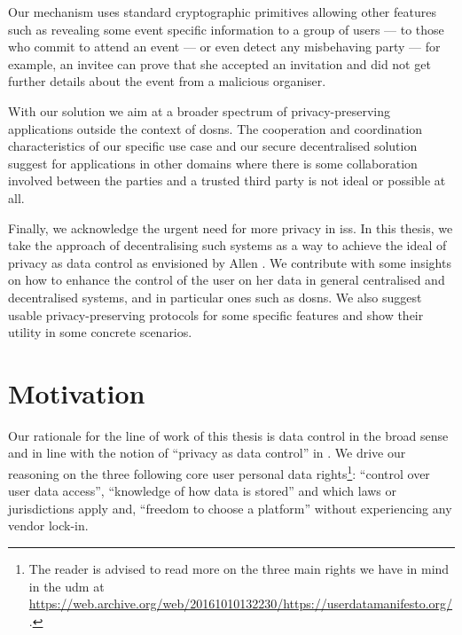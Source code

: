 Our mechanism uses standard cryptographic primitives allowing other features such 
as revealing some event specific information to a group of users --- to those who 
commit to attend an event --- or even detect any misbehaving party --- for example, 
an invitee can prove that she accepted an invitation and did not get further details 
about the event from a malicious organiser.

With our solution we aim at a broader spectrum of privacy-preserving applications 
outside the context of \acp{dosn}. The cooperation and coordination characteristics 
of our specific use case and our secure decentralised solution suggest for applications 
in other domains where there is some collaboration involved between the parties 
and a trusted third party is not ideal or possible at all.

Finally, we acknowledge the urgent need for more privacy in \acp{is}. 
In this thesis, we take the approach of decentralising such systems as a way to 
achieve the ideal of privacy as data control as envisioned by Allen \cite{Allen99}. 
We contribute with some insights on how to enhance the control of the user on her 
data in general centralised and decentralised systems, and in particular ones such 
as \acp{dosn}. We also suggest usable privacy-preserving protocols for some specific 
features and show their utility in some concrete scenarios.

\section{Motivation}
    \label{section:thesis:motivation}
Our rationale for the line of work of this thesis is data control in the broad sense 
and in line with the notion of ``privacy as data control'' in \cite{Allen99}. We 
drive our reasoning on the three following core user personal data rights\footnote{The 
reader is advised to read more on the three main rights we have in mind in the \Ac{udm} 
at \url{https://web.archive.org/web/20161010132230/https://userdatamanifesto.org/}.}: 
``control over user data access'', ``knowledge of how data is stored'' and which 
laws or jurisdictions apply and, ``freedom to choose a platform'' without experiencing 
any vendor lock-in.



